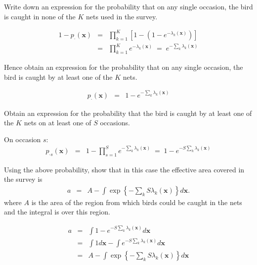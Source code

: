 \begin{questions}
\begin{parts}
\item Write down an expression for the probability that on any single occasion, the bird is caught in none of the $K$ nets used in the survey.

{\begin{solution}
\begin{eqnarray}
1-p_\cdot(\mathbf{x})&=&\prod_{k=1}^K\left[1-\left(1-e^{-\lambda_k(\mathbf{x})}\right)\right] \nonumber \\
&=&\prod_{k=1}^Ke^{-\lambda_k(\mathbf{x})}\;=\;e^{-\sum_k\lambda_k(\mathbf{x})} \nonumber
\end{eqnarray}

\end{solution}}

\item Hence obtain an expression for the probability that on any single occasion, the bird is caught by at least one of the $K$ nets. 

{\begin{solution}
\begin{eqnarray}
p_\cdot(\mathbf{x})&=&1-e^{-\sum_k\lambda_k(\mathbf{x})} \nonumber
\end{eqnarray}
\end{solution}}

\item Obtain an expression for the probability that the bird is caught by at least one of the $K$ nets on at least one of $S$ occasions.

{\begin{solution}
On occasion $s$:
\begin{eqnarray}
p_{\cdot s}(\mathbf{x})&=&1-\prod_{s=1}^Se^{-\sum_k\lambda_k(\mathbf{x})}\;=\;1-e^{-S\sum_k\lambda_k(\mathbf{x})} \nonumber
\end{eqnarray}
\end{solution}}

\item Using the above probability, show that in this case the effective area covered in the survey is
\begin{eqnarray*}
a&=&A-\int\exp\left\{-\sum_k S\lambda_k(\mathbf{x})\right\}d\mathbf{x}.
\end{eqnarray*}
\noindent
where $A$ is the area of the region from which birds could be caught in the nets and the integral is over this region.

{\begin{solution}
\begin{eqnarray}
a&=&\int 1-e^{-S\sum_k\lambda_k(\mathbf{x})}d\mathbf{x} \nonumber \\
&=&\int 1d\mathbf{x}-\int e^{-S\sum_k\lambda_k(\mathbf{x})}d\mathbf{x} \nonumber \\
&=&A-\int\exp\left\{-\sum_k S\lambda_k(\mathbf{x})\right\}d\mathbf{x} \nonumber
\end{eqnarray}
\end{solution}}


\end{parts}
\end{questions}
